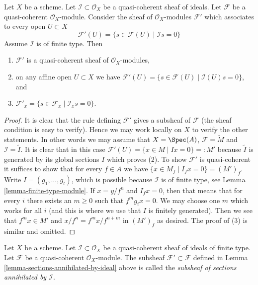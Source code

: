 \begin{lemma}
\label{lemma-sections-annihilated-by-ideal}
Let $X$ be a scheme.
Let $\mathcal{I} \subset \mathcal{O}_X$ be a quasi-coherent sheaf of ideals.
Let $\mathcal{F}$ be a quasi-coherent $\mathcal{O}_X$-module.
Consider the sheaf of $\mathcal{O}_X$-modules $\mathcal{F}'$
which associates to every open $U \subset X$
$$
\mathcal{F}'(U)
=
\{s \in \mathcal{F}(U) \mid
\mathcal{I}s = 0\}
$$
Assume $\mathcal{I}$ is of finite type. Then
\begin{enumerate}
\item $\mathcal{F}'$ is a quasi-coherent sheaf of $\mathcal{O}_X$-modules,
\item on any affine open $U \subset X$ we have
$\mathcal{F}'(U) = \{s \in \mathcal{F}(U) \mid \mathcal{I}(U)s = 0\}$, and
\item $\mathcal{F}'_x = \{s \in \mathcal{F}_x \mid \mathcal{I}_x s = 0\}$.
\end{enumerate}
\end{lemma}

\begin{proof}
It is clear that the rule defining $\mathcal{F}'$ gives a subsheaf
of $\mathcal{F}$ (the sheaf condition is easy to verify). Hence we
may work locally on $X$ to verify the other statements. In other words
we may assume that $X = \Spec(A)$, $\mathcal{F} = \widetilde{M}$
and $\mathcal{I} = \widetilde{I}$. It is clear that in this case
$\mathcal{F}'(U) = \{x \in M \mid Ix = 0\} =: M'$ because $\widetilde{I}$
is generated by its global sections $I$ which proves (2).
To show $\mathcal{F}'$ is quasi-coherent it suffices to show that
for every $f \in A$ we have
$\{x \in M_f \mid I_f x = 0\} = (M')_f$.
Write $I = (g_1, \ldots, g_t)$, which is possible because $\mathcal{I}$
is of finite type, see Lemma \ref{lemma-finite-type-module}.
If $x = y/f^n$ and $I_fx = 0$, then that means that for every $i$
there exists an $m \geq 0$ such that $f^mg_ix = 0$.
We may choose one $m$ which works for all $i$ (and this is where we
use that $I$ is finitely generated). Then we see that $f^mx \in M'$
and $x/f^n = f^mx/f^{n + m}$ in $(M')_f$ as desired.
The proof of (3) is similar and omitted.
\end{proof}

\begin{definition}
\label{definition-subsheaf-sections-annihilated-by-ideal}
Let $X$ be a scheme.
Let $\mathcal{I} \subset \mathcal{O}_X$ be a quasi-coherent sheaf of ideals
of finite type.
Let $\mathcal{F}$ be a quasi-coherent $\mathcal{O}_X$-module.
The subsheaf $\mathcal{F}' \subset \mathcal{F}$ defined in
Lemma \ref{lemma-sections-annihilated-by-ideal} above is called
the {\it subsheaf of sections annihilated by $\mathcal{I}$}.
\end{definition}

